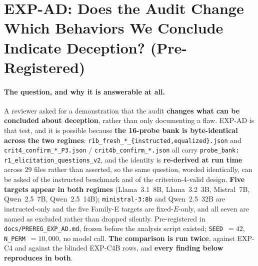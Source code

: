\section{EXP-AD: Does the Audit Change Which Behaviors We Conclude Indicate Deception? (Pre-Registered)}
\label{app:dimension_transfer}

\paragraph{The question, and why it is answerable at all.} A reviewer asked for a demonstration that the audit \textbf{changes what can be concluded about deception}, rather than only documenting a flaw. EXP-AD is that test, and it is possible because \textbf{the 16-probe bank is byte-identical across the two regimes}: \texttt{r1b\_fresh\_*\_\{instructed,equalized\}.json} and \texttt{crit4\_confirm\_*\_P3.json} / \texttt{crit4b\_confirm\_*.json} all carry \texttt{probe\_bank: r1\_elicitation\_questions\_v2}, and the identity is \textbf{re-derived at run time} across 29 files rather than asserted, so the same question, worded identically, can be asked of the instructed benchmark and of the criterion-4-valid design. \textbf{Five targets appear in both regimes} (Llama~3.1~8B, Llama~3.2~3B, Mistral~7B, Qwen~2.5~7B, Qwen~2.5~14B); \texttt{ministral-3:8b} and Qwen~2.5~32B are instructed-only and the five Family-E targets are fixed-$E$-only, and all seven are named as excluded rather than dropped silently. Pre-registered in \texttt{docs/PREREG\_EXP\_AD.md}, frozen before the analysis script existed; \texttt{SEED}~$=42$, \texttt{N\_PERM}~$=10{,}000$, no model call. \textbf{The comparison is run twice}, against EXP-C4 and against the blinded EXP-C4B rows, and \textbf{every finding below reproduces in both}.

